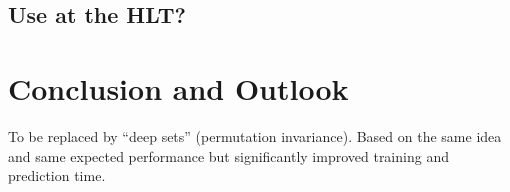 \subsection{Use at the HLT?}

\cite{ATL-DAQ-PUB-2019-001}


\section{Conclusion and Outlook}
\label{sec:tauid_conclusion}


To be replaced by ``deep sets'' (permutation invariance). Based on the
same idea and same expected performance but significantly improved
training and prediction time.

